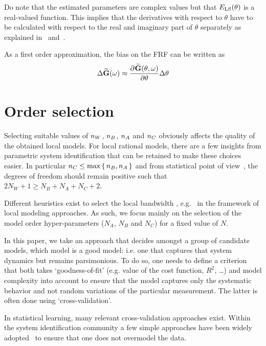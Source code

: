 Do note that the estimated parameters are complex values but that ${E}_{\mathrm{LS}}\!\left( \theta \right)$ is a real-valued function.
This implies that the derivatives with respect to $\theta$ have to be calculated with respect to the real and imaginary part of $\theta$ separately as explained in~\citep{Messerschmitt2006} and~\citep[Section 15.9]{Pintelon2012}.

As a first order approximation, the bias on the \gls{FRF} can be written as
\begin{equation}
  \Delta \widetilde{\mathbf{G}}(\omega) \approx \frac{{\partial}^{} \widetilde{\mathbf{G}}(\theta, \omega)}{\partial \theta} \Delta \theta
\end{equation}

\section{Order selection}
Selecting suitable values of $n_{W}$, $n_{B}$, $n_{A}$ and $n_{C}$ obviously affects the quality of the obtained local models.
For local rational models, there are a few insights from parametric system identification that can be retained to make these choices easier.
In particular $n_{C} \leq \max\set{\ensuremath{n_{B}},\ensuremath{n_{A}}}$ and from statistical point of view~\citep{Mahata2006}, the degrees of freedom should remain positive such that $2N_W + 1 \geq N_B + N_A + N_C + 2$.

Different heuristics exist to select the local bandwidth , e.g.~\citep{Fan1995,Thummala2012LPMBW,Stenman2000ASETFE} in the framework of local modeling approaches.
As such, we focus mainly on the selection of the model order hyper-parameters ($N_A$, $N_B$ and $N_C$) for a fixed value of $N$.

In this paper, we take an approach that decides amongst a group of candidate models, which model is a good model: i.e. one that captures that system dynamics but remains parsimonious.
To do so, one needs to define a criterion that both takes `goodness-of-fit' (e.g. value of the cost function, $R^2$, \ldots) and model complexity into account to ensure that the model captures only the systematic behavior and not random variations of the particular measurement.
The latter is often done using `cross-validation'.

In statistical learning, many relevant cross-validation approaches exist.
Within the system identification community a few simple approaches have been widely adopted~\citep[Chapter 11]{Pintelon2012} to ensure that one does not overmodel the data.
